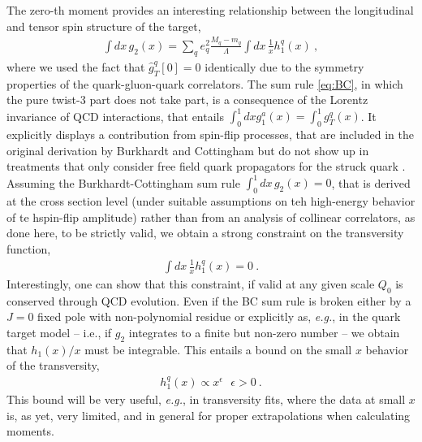 \documentclass[preprintnumbers,floatfix,nofootinbib]{revtex4}
\newcommand{\eg}{{\em e.g.}}
\newcommand{\mj}{M_q}
\newcommand{\mq}{m_q}
\begin{document}
The zero-th moment provides an interesting relationship between the longitudinal and tensor spin structure of the target,
\begin{align}
  \label{eq:BC}
  \int dx\, g_2(x) = \sum_q e_q^2 \frac{\mj-\mq}{\Lambda} \int dx\, \frac{1}{x} h_1^q(x) \ ,
\end{align}
where we used the fact that $\hat g_T^q[0]=0$ identically due to the symmetry properties of the quark-gluon-quark correlators. The sum rule \eqref{eq:BC}, in which the pure twist-3 part does not take part, is a consequence of the Lorentz invariance of QCD interactions, that entails $\int_0^1 dx g_1^a(x) = \int_0^1 g_T^q(x)$. It explicitly displays a contribution from spin-flip processes, that are included in the original derivation by Burkhardt and Cottingham \cite{Burkhardt:1970ti} but do not show up in treatments that only consider free field quark propagators for the struck quark \cite{Jaffe:1996zw}. Assuming the Burkhardt-Cottingham sum rule $\int_0^1 dx\, g_2(x) =0$, that is derived at the cross section level (under suitable assumptions on teh high-energy behavior of te hspin-flip amplitude) rather than from an analysis of collinear correlators, as done here, to be strictly valid, we obtain a strong constraint on the transversity function,
\begin{align}
   \int dx\, \frac{1}{x} h_1^q(x) = 0 \ .
\label{eq:ABsumrule}
\end{align}
Interestingly, one can show that this constraint, if valid at any given scale $Q_0$ is conserved through QCD evolution. Even if the BC sum rule is broken either by a $J = 0$ fixed pole with non-polynomial residue \cite{Jaffe:1996zw} or explicitly as, \eg, in the quark target model \cite{Metz-Kundu} -- i.e., if $g_2$ integrates to a finite but non-zero number -- we obtain that $h_1(x)/x$ must be integrable. This entails a bound on the small $x$ behavior of the transversity,
\begin{align}
  h_1^q(x) \propto x^\epsilon \ \ \ \epsilon>0 \ .
\label{eq:ABbound}
\end{align}
This bound will be very useful, \eg, in transversity fits, where the data at
small $x$ is, as yet, very limited, and in general for proper extrapolations
when calculating moments. 
\end{document}
